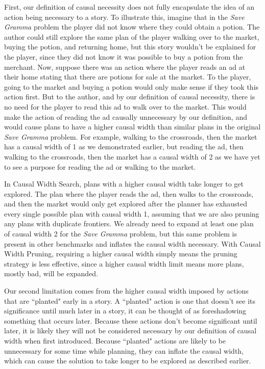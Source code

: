 \documentclass[letterpaper]{article} %
\begin{document}
First, our definition of causal necessity does not fully encapsulate the idea of an action being necessary to a story. To illustrate this, imagine that in the \textit{Save Gramma} problem the player did not know where they could obtain a potion. The author could still explore the same plan of the player walking over to the market, buying the potion, and returning home, but this story wouldn't be explained for the player, since they did not know it was possible to buy a potion from the merchant. Now, suppose there was an action where the player reads an ad at their home stating that there are potions for sale at the market. To the player, going to the market and buying a potion would only make sense if they took this action first. But to the author, and by our definition of causal necessity, there is no need for the player to read this ad to walk over to the market. This would make the action of reading the ad causally unnecessary by our definition, and would cause plans to have a higher causal width than similar plans in the original \textit{Save Gramma} problem. For example, walking to the crossroads, then the market has a causal width of 1 as we demonstrated earlier, but reading the ad, then walking to the crossroads, then the market has a causal width of 2 as we have yet to see a purpose for reading the ad or walking to the market.

In Causal Width Search, plans with a higher causal width take longer to get explored. The plan where the player reads the ad, then walks to the crossroads, and then the market would only get explored after the planner has exhausted every single possible plan with causal width 1, assuming that we are also pruning any plans with duplicate frontiers. We already need to expand at least one plan of causal width 2 for the \textit{Save Gramma} problem, but this same problem is present in other benchmarks and inflates the causal width necessary. With Causal Width Pruning, requiring a higher causal width simply means the pruning strategy is less effective, since a higher causal width limit means more plans, mostly bad, will be expanded.

Our second limitation comes from the higher causal width imposed by actions that are ``planted" early in a story. A ``planted" action is one that doesn't see its significance until much later in a story, it can be thought of as foreshadowing something that occurs later. Because these actions don't become significant until later, it is likely they will not be considered necessary by our definition of causal width when first introduced. Because ``planted" actions are likely to be unnecessary for some time while planning, they can inflate the causal width, which can cause the solution to take longer to be explored as described earlier. 
\end{document}

